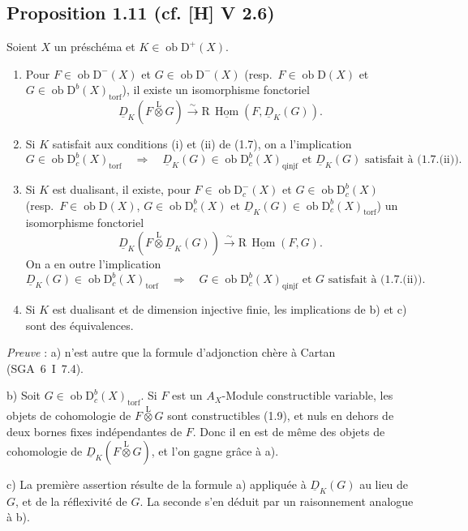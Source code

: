 \documentclass[11pt]{article}
\DeclareMathOperator{\Hom}{Hom}
\newcommand{\R}{\mathrm{R}}\newcommand{\RHomCore}{\mathrm{RHom}}
\newcommand{\D}{\mathrm{D}}
\newcommand{\ob}{\operatorname{ob}}
\providecommand{\Hom}{\operatorname{Hom}}
\providecommand{\ob}{\operatorname{ob}}
\providecommand{\R}{\mathrm R}
\providecommand{\Hom}{\operatorname{Hom}}
\begin{document}
\subsection*{Proposition 1.11 (cf. [H] V 2.6)}
Soient $X$ un préschéma et $K \in \ob \D^{+}(X)$.
\begin{enumerate}
\item[a)] Pour $F \in \ob \D^{-}(X)$ et $G \in \ob \D^{-}(X)$ (resp.~$F \in \ob \D(X)$ et $G \in \ob \D^{b}(X)_{\mathrm{torf}}$), il existe un isomorphisme fonctoriel
\[
\underline{D}_K(F \mathop{\otimes}\limits^{\mathrm{L}} G) \xrightarrow{\sim} \R\,\underline{\Hom}(F, \underline{D}_K(G)).
\]
\item[b)] Si $K$
satisfait aux conditions (i) et (ii) de (1.7), on a l'implication
\[
G \in \ob \D_c^{b}(X)_{\mathrm{torf}} \quad \Longrightarrow \quad \underline{D}_K(G) \in \ob \D_c^{b}(X)_{\mathrm{qinjf}} \text{ et } \underline{D}_K(G) \text{ satisfait à (1.7.(ii)).}
\]
\item[c)] Si $K$ est dualisant, il existe, pour $F \in \ob \D_c^{-}(X)$ et $G \in \ob \D_c^{b}(X)$ (resp.~$F \in \ob \D(X)$, $G \in \ob \D_c^{b}(X)$ et $\underline{D}_K(G) \in \ob \D_c^{b}(X)_{\mathrm{torf}}$) un isomorphisme fonctoriel
\[
\underline{D}_K(F \mathop{\otimes}\limits^{\mathrm{L}} \underline{D}_K(G)) \xrightarrow{\sim} \R\,\underline{\Hom}(F, G).
\]
On a en outre l'implication
\[
\underline{D}_K(G) \in \ob \D_c^{b}(X)_{\mathrm{torf}} \quad \Longrightarrow \quad G \in \ob \D_c^{b}(X)_{\mathrm{qinjf}} \text{ et } G \text{ satisfait à (1.7.(ii)).}
\]
\item[d)] Si $K$ est dualisant et de dimension injective finie, les implications de b) et c) sont des équivalences.
\end{enumerate}

\emph{Preuve} : a) n'est autre que la formule d'adjonction chère à Cartan (SGA~6~I~7.4).

b) Soit $G \in \ob \D_c^{b}(X)_{\mathrm{torf}}$. Si $F$ est un $A_X$-Module constructible variable, les objets de cohomologie de $F \mathop{\otimes}\limits^{\mathrm{L}} G$ sont constructibles (1.9), et nuls en dehors de deux bornes fixes indépendantes de $F$. Donc il en est de même des objets de cohomologie de $\underline{D}_K(F \mathop{\otimes}\limits^{\mathrm{L}} G)$, et l'on gagne grâce à a).

c) La première assertion résulte de la formule a) appliquée à $\underline{D}_K(G)$ au lieu de $G$, et de la réflexivité de $G$. La seconde s'en déduit par un raisonnement analogue à b).
\end{document}
